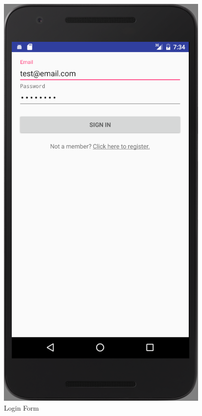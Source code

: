 \begin{figure}[ht]
\begin{minipage}[b]{0.45\linewidth}
    \includegraphics[width=.7\linewidth, frame]{../images/Screenshot/LoginPage.png}
    \caption{Login Form} 
    \vspace{4ex}
  \end{minipage} 
  \begin{minipage}[b]{0.45\linewidth}
    \centering

\end{minipage}
\end{figure}
